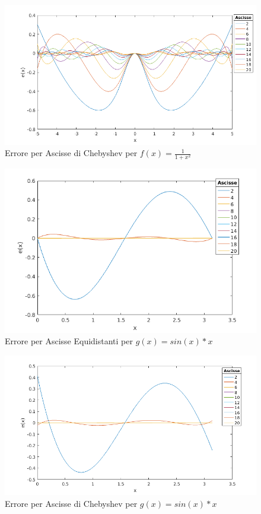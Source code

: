 \begin{figure}
\includegraphics[width=\textwidth]{cap_4/es2/Runge_cheb_err.png}
\caption{Errore per Ascisse di Chebyshev per $f(x) = \frac{1}{1+x^2}$}
\label{RungeCheErr}
\end{figure}

\begin{figure}
\includegraphics[width=\textwidth]{cap_4/es2/Sin_equi_err.png}
\caption{Errore per Ascisse Equidistanti per $g(x) = sin(x)*x$}
\label{SinEqErr}
\end{figure}

\begin{figure}
\includegraphics[width=\textwidth]{cap_4/es2/Sin_cheb_Err.png}
\caption{Errore per Ascisse di Chebyshev per $g(x) = sin(x)*x$}
\label{SinCheErr}
\end{figure}


